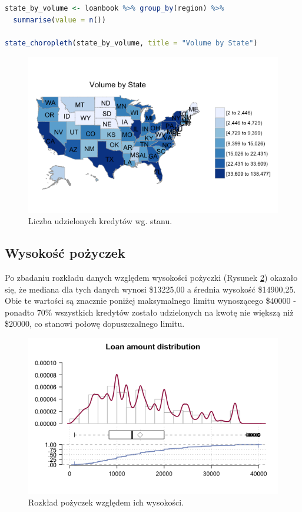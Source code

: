 \begin{lstlisting}[language=R, caption={Skrypt wyliczający liczbę udzielonych kredytów dla każdego stanu}, label={r:volumeState}]
state_by_volume <- loanbook %>% group_by(region) %>%
  summarise(value = n())

state_choropleth(state_by_volume, title = "Volume by State")
\end{lstlisting}

\begin{figure}[h] \centering %
	\includegraphics[scale=0.7]{img/volume_state.png}
	\caption{Liczba udzielonych kredytów wg. stanu.}
	\label{lc:volume_state}
\end{figure}

\subsection{Wysokość pożyczek}

Po zbadaniu rozkładu danych względem wysokości pożyczki (Rysunek \ref{lc:amnt_distrib}) okazało się, że mediana dla tych danych wynosi \$13225,00 a średnia wysokość \$14900,25. Obie te wartości są znacznie poniżej maksymalnego limitu wynoszącego \$40000 - ponadto 70\% wszystkich kredytów zostało udzielonych na kwotę nie większą niż \$20000, co stanowi połowę dopuszczalnego limitu.

\begin{figure}[h] \centering %
	\includegraphics[scale=0.5]{img/loan_amt_distrib.png}
	\caption{Rozkład pożyczek względem ich wysokości.}
	\label{lc:amnt_distrib}
\end{figure}

